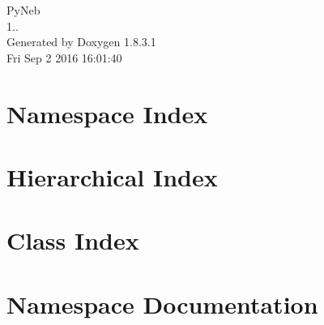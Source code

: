 \documentclass{book}
\begin{document}
\hypersetup{pageanchor=false,citecolor=blue}
\begin{titlepage}
\vspace*{7cm}
\begin{center}
{\Large Py\-Neb \\[1ex]\large 1.. }\\
\vspace*{1cm}
{\large Generated by Doxygen 1.8.3.1}\\
\vspace*{0.5cm}
{\small Fri Sep 2 2016 16:01:40}\\
\end{center}
\end{titlepage}
\clearemptydoublepage
{}
\tableofcontents
\clearemptydoublepage
{}
\hypersetup{pageanchor=true,citecolor=blue}
\chapter{Namespace Index}

\chapter{Hierarchical Index}

\chapter{Class Index}

\chapter{Namespace Documentation}
































\end{document}
